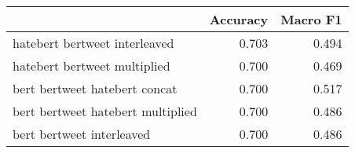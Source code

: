 \begin{tabular}{lrr}
\toprule
{} &  Accuracy &  Macro F1 \\
\midrule
hatebert bertweet interleaved      &     0.703 &     0.494 \\
hatebert bertweet multiplied       &     0.700 &     0.469 \\
bert bertweet hatebert concat      &     0.700 &     0.517 \\
bert bertweet hatebert multiplied  &     0.700 &     0.486 \\
bert bertweet interleaved          &     0.700 &     0.486 \\
\bottomrule
\end{tabular}
